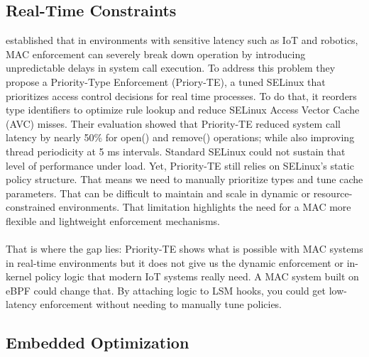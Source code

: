 \subsection{Real-Time Constraints}

\cite{Real_time_Mandatory_Access_Control_on_SELinux_for_Internet_of_Things} established that in environments with sensitive latency such as IoT and robotics, MAC enforcement can severely break down operation by introducing unpredictable delays in system call execution. To address this problem they propose a Priority-Type Enforcement (Priory-TE), a tuned SELinux that prioritizes access control decisions for real time processes. To do that, it reorders type identifiers to optimize rule lookup and reduce SELinux Access Vector Cache (AVC) misses. Their evaluation showed that Priority-TE reduced system call latency by nearly 50\% for open() and remove() operations; while also improving thread periodicity at 5 ms intervals. Standard SELinux could not sustain that level of performance under load. Yet, Priority-TE still relies on SELinux's static policy structure. That means we need to manually prioritize types and tune cache parameters. That can be difficult to maintain and scale in dynamic or resource-constrained environments. That limitation highlights the need for a MAC more flexible and lightweight enforcement mechanisms.
\\\\
That is where the gap lies: Priority-TE shows what is possible with MAC systems in real-time environments but it does not give us the dynamic enforcement or in-kernel policy logic that modern IoT systems really need. A MAC system built on eBPF could change that. By attaching logic to LSM hooks, you could get low-latency enforcement without needing to manually tune policies.
\subsection{Embedded Optimization}


